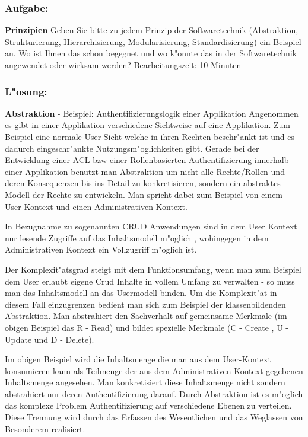 \subsubsection*{Aufgabe:}

\begin{framed}
\textbf{Prinzipien}
\smallbreak
Geben Sie bitte zu jedem Prinzip der Softwaretechnik (Abstraktion, Strukturierung, Hierarchisierung, Modularisierung, Standardisierung) ein Beispiel an. Wo ist Ihnen das schon begegnet und wo k"onnte das in der Softwaretechnik angewendet oder wirksam werden?
\bigbreak
\small Bearbeitungszeit: 10 Minuten
\end{framed}
\bigbreak
\bigbreak
\subsubsection*{L"osung:}
\textbf{Abstraktion}
- Beispiel: Authentifizierungslogik einer Applikation
\smallbreak
Angenommen es gibt in einer Applikation verschiedene Sichtweise auf eine Applikation.
\smallbreak
Zum Beispiel eine normale User-Sicht welche in ihren Rechten beschr"ankt ist und es dadurch eingeschr"ankte Nutzungsm"oglichkeiten gibt.
Gerade bei der Entwicklung einer ACL bzw einer Rollenbasierten Authentifizierung innerhalb einer Applikation benutzt man Abstraktion um nicht alle Rechte/Rollen und deren Konsequenzen bis ins Detail zu konkretisieren, sondern ein abstraktes Modell der Rechte zu entwickeln.
Man spricht dabei zum Beispiel von einem User-Kontext und einen Administrativen-Kontext.

In Bezugnahme zu sogenannten CRUD Anwendungen sind in dem User Kontext nur lesende Zugriffe auf das Inhaltsmodell m"oglich , wohingegen in dem Administrativen Kontext ein Vollzugriff m"oglich ist.

Der Komplexit"atsgrad steigt mit dem Funktionsumfang, wenn man zum Beispiel dem User erlaubt eigene Crud Inhalte in vollem Umfang zu verwalten - so muss man das Inhaltsmodell an das Usermodell binden.
Um die Komplexit"at in diesem Fall einzugrenzen bedient man sich zum Beispiel der klassenbildenden Abstraktion. Man abstrahiert den Sachverhalt auf gemeinsame Merkmale (im obigen Beispiel das R - Read) und bildet spezielle Merkmale (C - Create , U - Update und D - Delete).

Im obigen Beispiel wird die Inhaltsmenge die man aus dem User-Kontext konsumieren kann als Teilmenge der aus dem Administrativen-Kontext gegebenen Inhaltsmenge angesehen.
Man konkretisiert diese Inhaltsmenge nicht sondern abstrahiert nur deren Authentifizierung darauf. Durch Abstraktion ist es m"oglich das komplexe Problem Authentifizierung auf verschiedene Ebenen zu verteilen. Diese Trennung wird durch das Erfassen des Wesentlichen und das Weglassen von Besonderem realisiert.



